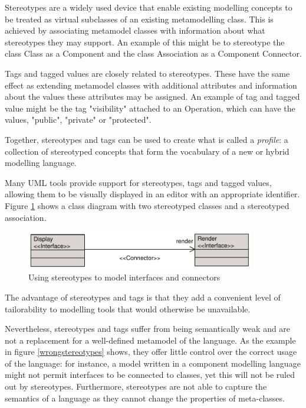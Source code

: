 Stereotypes are a widely used device that enable existing
modelling concepts to be treated as virtual subclasses of an
existing metamodelling class. This is achieved by associating
metamodel classes with information about what stereotypes they may
support. An example of this might be to stereotype the class Class
as a Component and the class Association as a Component Connector.

Tags and tagged values are closely related to stereotypes. These
have the same effect as extending metamodel classes with
additional attributes and information about the values these
attributes may be assigned. An example of tag and tagged value
might be the tag "visibility" attached to an Operation, which can
have the values, "public", "private" or "protected".

Together, stereotypes and tags can be used to create what is
called a {\em profile}: a collection of stereotyped concepts that
form the vocabulary of a new or hybrid modelling language.

Many UML tools provide support for stereotypes, tags and tagged
values, allowing them to be visually displayed in an editor with
an appropriate identifier. Figure \ref{stereotypeExample} shows a
class diagram with two stereotyped classes and a stereotyped
association.

\begin{figure}[htb]
\begin{center}
\includegraphics[width=10cm]{LanguageFamilies/figures/Stereotypes}
\caption{Using stereotypes to model interfaces and connectors}
\label{stereotypeExample}
\end{center}
\end{figure}

The advantage of stereotypes and tags is that they add a
convenient level of tailorability to modelling tools that would
otherwise be unavailable.

Nevertheless, stereotypes and tags suffer from being semantically
weak and are not a replacement for a well-defined metamodel of the
language. As the example in figure \ref{wrongstereotypes} shows,
they offer little control over the correct usage of the language:
for instance, a model written in a component modelling language
might not permit interfaces to be connected to classes, yet this
will not be ruled out by stereotypes. Furthermore, stereotypes are
not able to capture the semantics of a language as they cannot
change the properties of meta-classes.

